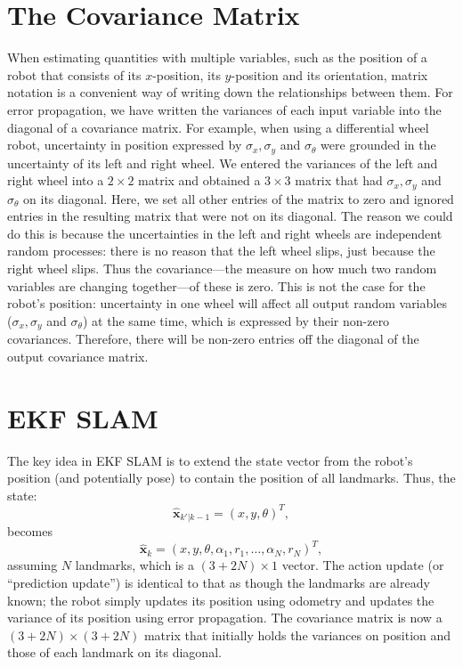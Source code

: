 \section{The Covariance Matrix}
When estimating quantities with multiple variables, such as the position of a robot that consists of its $x$-position, its $y$-position and its orientation, matrix notation is a convenient way of writing down the relationships between them. For error propagation, we have written the variances of each input variable into the diagonal of a covariance matrix. For example, when using a differential wheel robot, uncertainty in position expressed by $ \sigma_x, \sigma_y$ and $ \sigma_{\theta}$ were grounded in the uncertainty of its left and right wheel. We entered the variances of the left and right wheel into a $2 \times 2$ matrix and obtained a $3 \times 3$ matrix that had $ \sigma_x, \sigma_y$ and $ \sigma_{\theta}$ on its diagonal. Here, we set all other entries of the matrix to zero and ignored entries in the resulting matrix that were not on its diagonal. The reason we could do this is because the uncertainties in the left and right wheels are independent random processes: there is no reason that the left wheel slips, just because the right wheel slips. Thus the covariance---the measure on how much two random variables are changing together---of these is zero. This is not the case for the robot's position: uncertainty in one wheel will affect all output random variables ($ \sigma_x, \sigma_y$ and $ \sigma_{\theta}$) at the same time, which is expressed by their non-zero covariances. Therefore, there will be non-zero entries off the diagonal of the output covariance matrix.

\section{EKF SLAM}\label{sec:ekfslam}\label{sec:ekfslam}
The key idea in EKF SLAM is to extend the state vector from the robot's position (and potentially pose) to contain the position of all landmarks. Thus, the state:
\begin{equation}
\hat{\boldsymbol{x}}_{k'|k-1}=(x,y,\theta)^T,
\end{equation}
\noindent becomes
\begin{equation}
\hat{\boldsymbol{x}}_{k}=(x,y,\theta,\alpha_1,r_1,\ldots,\alpha_N,r_N)^T,
\end{equation}
\noindent assuming $ N$ landmarks, which is a $(3+2N)\times 1$ vector. The action update (or ``prediction update'') is identical to that as though the landmarks are already known; the robot simply updates its position using odometry and updates the variance of its position using error propagation. The covariance matrix is now a $(3+2N) \times (3+2N)$ matrix that initially holds the variances on position and those of each landmark on its diagonal.

